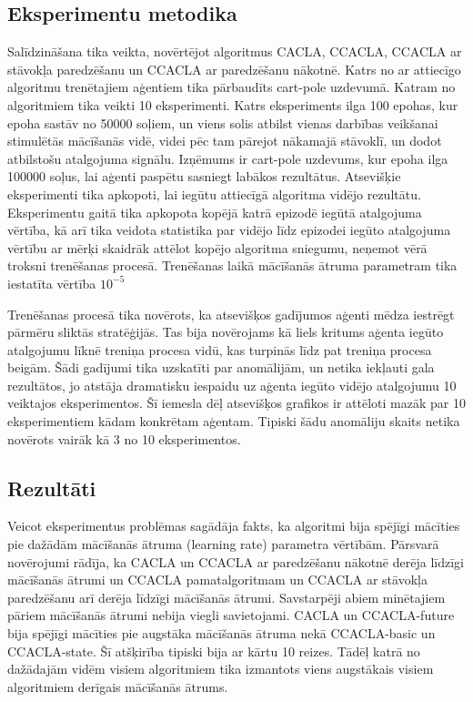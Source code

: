 \documentclass{ludis} %
\begin{document}

\subsection{Eksperimentu metodika}
Salīdzināšana tika veikta, novērtējot algoritmus CACLA, CCACLA, CCACLA ar
stāvokļa paredzēšanu un CCACLA ar paredzēšanu nākotnē. Katrs no ar attiecīgo
algoritmu trenētajiem aģentiem tika pārbaudīts cart-pole uzdevumā. Katram no
algoritmiem tika veikti 10 eksperimenti. Katrs eksperiments ilga 100 epohas, kur
epoha sastāv no 50000 soļiem, un viens solis atbilst vienas darbības veikšanai
stimulētās mācīšanās vidē, videi pēc tam pārejot nākamajā stāvoklī, un dodot
atbilstošu atalgojuma signālu. Izņēmums ir cart-pole uzdevums, kur epoha ilga
100000 soļus, lai aģenti paspētu sasniegt labākos rezultātus. Atsevišķie
eksperimenti tika apkopoti, lai iegūtu attiecīgā algoritma vidējo rezultātu.
Eksperimentu gaitā tika apkopota kopējā katrā epizodē iegūtā atalgojuma vērtība,
kā arī tika veidota statistika par vidējo līdz epizodei iegūto atalgojuma
vērtību ar mērķi skaidrāk attēlot kopējo algoritma sniegumu, neņemot vērā
troksni trenēšanas procesā. Trenēšanas laikā mācīšanās ātruma parametram tika
iestatīta vērtība $10^{-5}$

Trenēšanas procesā tika novērots, ka atsevišķos gadījumos aģenti mēdza iestrēgt
pārmēru sliktās stratēģijās. Tas bija novērojams kā liels kritums aģenta iegūto
atalgojumu līknē treniņa procesa vidū, kas turpinās līdz pat treniņa procesa
beigām. Šādi gadījumi tika uzskatīti par anomālijām, un netika iekļauti gala
rezultātos, jo atstāja dramatisku iespaidu uz aģenta iegūto vidējo atalgojumu 10
veiktajos eksperimentos. Šī iemesla dēļ atsevišķos grafikos ir attēloti mazāk
par 10 eksperimentiem kādam konkrētam aģentam. Tipiski šādu anomāliju skaits
netika novērots vairāk kā 3 no 10 eksperimentos.


\subsection{Rezultāti}
Veicot eksperimentus problēmas sagādāja fakts, ka algoritmi bija spējīgi
mācīties pie dažādām mācīšanās ātruma (learning rate) parametra vērtībām.
Pārsvarā novērojumi rādīja, ka CACLA un CCACLA ar paredzēšanu nākotnē derēja
līdzīgi mācīšanās ātrumi un CCACLA pamatalgoritmam un CCACLA ar stāvokļa
paredzēšanu arī derēja līdzīgi mācīšanās ātrumi. Savstarpēji abiem minētajiem
pāriem mācīšanās ātrumi nebija viegli savietojami. CACLA un CCACLA-future bija
spējīgi mācīties pie augstāka mācīšanās ātruma nekā CCACLA-basic un
CCACLA-state. Šī atšķirība tipiski bija ar kārtu 10 reizes. Tādēļ katrā no
dažādajām vidēm visiem algoritmiem tika izmantots viens augstākais visiem
algoritmiem derīgais mācīšanās ātrums.
\end{document}
